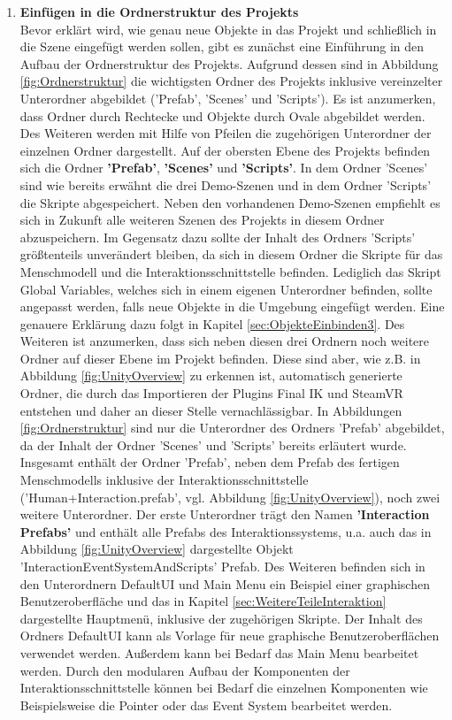 \begin{enumerate}
	\item \textbf{Einfügen in die Ordnerstruktur des Projekts} \\
	Bevor erklärt wird, wie genau neue Objekte in das Projekt und schließlich in die Szene eingefügt werden sollen, gibt es zunächst eine Einführung in den Aufbau der Ordnerstruktur des Projekts. Aufgrund dessen sind in Abbildung \ref{fig:Ordnerstruktur} die wichtigsten Ordner des Projekts inklusive vereinzelter Unterordner abgebildet ('Prefab', 'Scenes' und 'Scripts'). Es ist anzumerken, dass Ordner durch Rechtecke und Objekte durch Ovale abgebildet werden. Des Weiteren werden mit Hilfe von Pfeilen die zugehörigen Unterordner der einzelnen Ordner dargestellt.
	\newline
	Auf der obersten Ebene des Projekts befinden sich die Ordner \textbf{'Prefab'}, \textbf{'Scenes'} und \textbf{'Scripts'}. In dem Ordner 'Scenes' sind wie bereits erwähnt die drei Demo-Szenen und in dem Ordner 'Scripts' die Skripte abgespeichert. Neben den vorhandenen Demo-Szenen empfiehlt es sich in Zukunft alle weiteren Szenen des Projekts in diesem Ordner abzuspeichern. Im Gegensatz dazu sollte der Inhalt des Ordners 'Scripts' größtenteils unverändert bleiben, da sich in diesem Ordner die Skripte für das Menschmodell und die Interaktionsschnittstelle befinden. Lediglich das Skript Global Variables, welches sich in einem eigenen Unterordner befinden, sollte angepasst werden, falls neue Objekte in die Umgebung eingefügt werden. Eine genauere Erklärung dazu folgt in Kapitel \ref{sec:ObjekteEinbinden3}. Des Weiteren ist anzumerken, dass sich neben diesen drei Ordnern noch weitere Ordner auf dieser Ebene im Projekt befinden. Diese sind aber, wie z.B. in Abbildung \ref{fig:UnityOverview} zu erkennen ist, automatisch generierte Ordner, die durch das Importieren der Plugins Final IK und SteamVR entstehen und daher an dieser Stelle vernachlässigbar. 
	\newline
	In Abbildungen \ref{fig:Ordnerstruktur} sind nur die Unterordner des Ordners 'Prefab' abgebildet, da der Inhalt der Ordner 'Scenes' und 'Scripts' bereits erläutert wurde. Insgesamt enthält der Ordner 'Prefab', neben dem Prefab des fertigen Menschmodells inklusive der Interaktionsschnittstelle ('Human+Interaction.prefab', vgl. Abbildung \ref{fig:UnityOverview}), noch zwei weitere Unterordner.
	\newline
	Der erste Unterordner trägt den Namen \textbf{'Interaction Prefabs'} und enthält alle Prefabs des Interaktionssystems, u.a. auch das in Abbildung \ref{fig:UnityOverview} dargestellte Objekt 'InteractionEventSystemAndScripts' Prefab. Des Weiteren befinden sich in den Unterordnern DefaultUI und Main Menu ein Beispiel einer graphischen Benutzeroberfläche und das in Kapitel \ref{sec:WeitereTeileInteraktion} dargestellte Hauptmenü, inklusive der zugehörigen Skripte. Der Inhalt des Ordners DefaultUI kann als Vorlage für neue graphische Benutzeroberflächen verwendet werden. Außerdem kann bei Bedarf das Main Menu bearbeitet werden. Durch den modularen Aufbau der Komponenten der Interaktionsschnittstelle können bei Bedarf die einzelnen Komponenten wie Beispielsweise die Pointer oder das Event System bearbeitet werden.

\end{enumerate}
